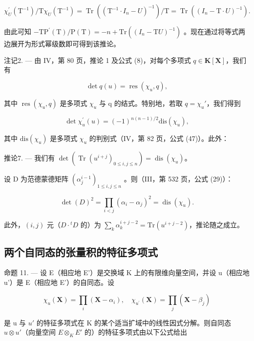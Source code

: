 \[
\chi_ {U} ^ {\prime} \left(\mathrm{T} ^ {- 1}\right) / \mathrm{T} \chi_ {U} \left(\mathrm{T} ^ {- 1}\right) = \operatorname{Tr} \left(\left(\mathrm{T} ^ {- 1} \cdot I _ {n} - U\right) ^ {- 1}\right) / \mathrm{T} = \operatorname{Tr} \left(\left(I _ {n} - \mathrm{T} \cdot U\right) ^ {- 1}\right).
\]

由此可知 \(-\mathrm{TP}^{\prime}(\mathrm{T})/\mathrm{P}(\mathrm{T})=-n+\mathrm{Tr}\left((I_{n}-\mathrm{T}U)^{-1}\right)\) 。现在通过将等式两边展开为形式幂级数即可得到该推论。

注记2. --- 由 IV，第 80 页，推论 1 及公式 (8)，对每个多项式 \(q \in \mathbf{K}[\mathbf{X}]\)，我们有

\[
\det q (u) = \operatorname{res} \left(\chi_ {u}, q\right),\tag{9}
\]

其中 \(\operatorname{res}(\chi_{u}, q)\) 是多项式 \(\chi_{u}\) 与 q 的结式。特别地，若取 \(q = \chi_{u}'\)，我们得到

\[
\det \chi_ {u} ^ {\prime} (u) = (- 1) ^ {n (n - 1) / 2} \mathrm{dis} (\chi_ {u}),\tag{10}
\]

其中 \(\mathrm{dis}(\chi_{u})\) 是多项式 \(\chi_{u}\) 的判别式（IV，第 82 页，公式 (47)）。此外：

推论7. --- 我们有 \(\det\left(\operatorname{Tr}\left(u^{i+j}\right)_{0\leqslant i,j\leqslant n}\right)=\operatorname{dis}\left(\chi_{u}\right)\)。

设 D 为范德蒙德矩阵 \((\alpha_j^{i-1})_{1 \leqslant i, j \leqslant n}\) 。则（III，第 532 页，公式 (29)）：

\[
\det (D) ^ {2} = \prod_ {i <   j} (\alpha_ {i} - \alpha_ {j}) ^ {2} = \operatorname{dis} (\chi_ {u}).
\]

此外，\((i,j)\) 元（\(D\cdot {}^t D\) 的）为 \(\sum_{k}\alpha_{k}^{i + j - 2} = \mathrm{Tr}(u^{i + j - 2})\)，推论随之成立。

\subsection{两个自同态的张量积的特征多项式}

命题 11. --- 设 E（相应地 E'）是交换域 K 上的有限维向量空间，并设 u（相应地 u'）是 E（相应地 E'）的自同态。设

\[
\chi_ {u} (\mathbf {X}) = \prod_ {i} \left(\mathbf {X} - \alpha_ {i}\right), \quad \chi_ {u ^ {\prime}} (\mathbf {X}) = \prod_ {j} \left(\mathbf {X} - \beta_ {j}\right)
\]

是 u 与 \(u'\) 的特征多项式在 K 的某个适当扩域中的线性因式分解。则自同态 \(u \otimes u'\)（向量空间 \(E \otimes_{K} E'\) 的）的特征多项式由以下公式给出

